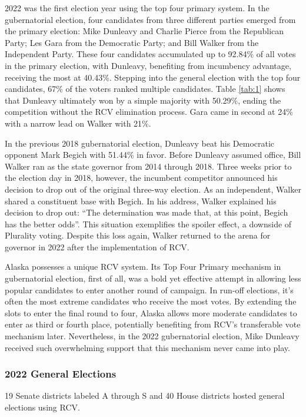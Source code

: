 2022 was the first election year using the top four primary system. In the gubernatorial election, four candidates from three different parties emerged from the primary election: Mike Dunleavy and Charlie Pierce from the Republican Party; Les Gara from the Democratic Party; and Bill Walker from the Independent Party. These four candidates accumulated up to 92.84\% of all votes in the primary election, with Dunleavy, benefiting from incumbency advantage, receiving the most at 40.43\%. Stepping into the general election with the top four candidates, 67\% of the voters ranked multiple candidates. Table \ref{tab:1} shows that Dunleavy ultimately won by a simple majority with 50.29\%, ending the competition without the RCV elimination process. Gara came in second at 24\% with a narrow lead on Walker with 21\%.

In the previous 2018 gubernatorial election, Dunleavy beat his Democratic opponent Mark Begich with 51.44\% in favor. Before Dunleavy assumed office, Bill Walker ran as the state governor from 2014 through 2018. Three weeks prior to the election day in 2018, however, the incumbent competitor announced his decision to drop out of the original three-way election. As an independent, Walker shared a constituent base with Begich. In his address, Walker explained his decision to drop out: “The determination was made that, at this point, Begich has the better odds”. This situation exemplifies the spoiler effect, a downside of Plurality voting. Despite this loss again, Walker returned to the arena for governor in 2022 after the implementation of RCV. 

Alaska possesses a unique RCV system. Its Top Four Primary mechanism in gubernatorial election, first of all, was a bold yet effective attempt in allowing less popular candidates to enter another round of campaign. In run-off elections, it’s often the most extreme candidates who receive the most votes. By extending the slots to enter the final round to four, Alaska allows more moderate candidates to enter as third or fourth place, potentially benefiting from RCV’s transferable vote mechanism later. Nevertheless, in the 2022 gubernatorial election, Mike Dunleavy received such overwhelming support that this mechanism never came into play. 

\subsubsection{2022 General Elections}

19 Senate districts labeled A through S and 40 House districts hosted general elections using RCV. 

